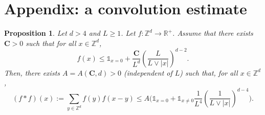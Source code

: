 \documentclass[11pt,a4paper]{article}
\numberwithin{equation}{section}
\theoremstyle{plain}
\newtheorem{Prop}[Thm]{Proposition}
\theoremstyle{definition}
\newcommand\bfC{\mathbf{C}}
\begin{document}
\section{Appendix: a convolution estimate}\label{appendix:convolution}
\begin{Prop}\label{prop: convolution estimate} Let $d>4$ and $L\geq 1$. Let $f:\mathbb Z^d\rightarrow \mathbb R^+$. Assume that there exists $\bfC>0$ such that for all $x\in \mathbb Z^d$,
\begin{equation}\label{eq:assumption convolution estimate}
	f(x)\leq \mathds{1}_{x=0}+\frac{\bfC}{L^d}\left(\frac{L}{L\vee |x|}\right)^{d-2}.
\end{equation}
Then, there exists $A=A(\bfC,d)>0$ (independent of $L$) such that, for all $x\in \mathbb Z^d$,
\begin{equation}
	(f*f)(x):=\sum_{y\in \mathbb Z^d}f(y)f(x-y)\leq A\Big(\mathds{1}_{x=0}+\mathds{1}_{x\neq 0}\frac{1}{L^4}{\left(\frac{1}{L\vee |x|}\right)^{d-4}}\Big).
\end{equation}
\end{Prop}
\end{document}

